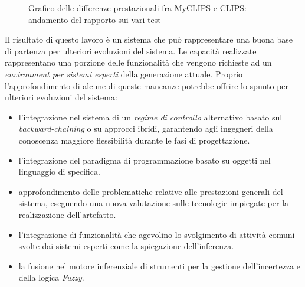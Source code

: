 \begin{figure}
\centering
{}
\caption[Grafico delle differenze prestazionali fra MyCLIPS e CLIPS]{Grafico delle differenze prestazionali fra MyCLIPS e CLIPS: andamento del rapporto sui vari test}\label{fig:myclips-vs-clips-bench}
\end{figure}


Il risultato di questo lavoro è un sistema che può rappresentare una buona base di partenza per ulteriori evoluzioni del sistema.
Le capacità realizzate rappresentano una porzione delle funzionalità che vengono richieste ad un \emph{environment per sistemi esperti} della generazione attuale. Proprio l'approfondimento di alcune di queste mancanze potrebbe offrire lo spunto per ulteriori evoluzioni del sistema:
\begin{itemize}
	\item l'integrazione nel sistema di un \emph{regime di controllo} alternativo basato sul \emph{backward-chaining} o su approcci ibridi, garantendo agli ingegneri della conoscenza maggiore flessibilità durante le fasi di progettazione.
	
	\item l'integrazione del paradigma di programmazione basato su oggetti nel linguaggio di specifica.
	
	\item approfondimento delle problematiche relative alle prestazioni generali del sistema, eseguendo una nuova valutazione sulle tecnologie impiegate per la realizzazione dell'artefatto.
	
	\item l'integrazione di funzionalità che agevolino lo svolgimento di attività comuni svolte dai sistemi esperti come la spiegazione dell'inferenza.
	
	\item la fusione nel motore inferenziale di strumenti per la gestione dell'incertezza e della logica \emph{Fuzzy}.
\end{itemize}
